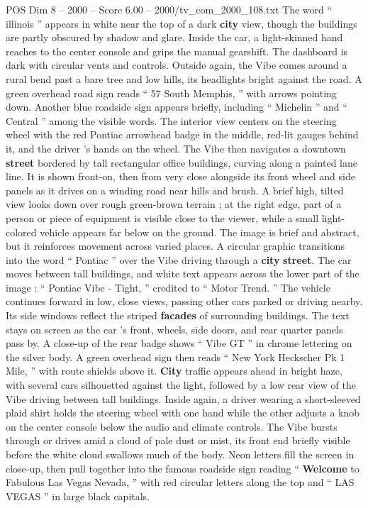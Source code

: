 \begin{textsample}{POS Dim 8 – 2000 – Score 6.00 – 2000/tv\_com\_2000\_108.txt}
The word “ illinois ” appears in white near the top of a dark \textbf{city} view, though the buildings are partly obscured by shadow and glare.
Inside the car, a light-skinned hand reaches to the center console and grips the manual gearshift.
The dashboard is dark with circular vents and controls.
Outside again, the Vibe comes around a rural bend past a bare tree and low hills, its headlights bright against the road.
A green overhead road sign reads “ 57 South Memphis, ” with arrows pointing down.
Another blue roadside sign appears briefly, including “ Michelin ” and “ Central ” among the visible words.
The interior view centers on the steering wheel with the red Pontiac arrowhead badge in the middle, red-lit gauges behind it, and the driver ’s hands on the wheel.
The Vibe then navigates a downtown \textbf{street} bordered by tall rectangular office buildings, curving along a painted lane line.
It is shown front-on, then from very close alongside its front wheel and side panels as it drives on a winding road near hills and brush.
A brief high, tilted view looks down over rough green-brown terrain ; at the right edge, part of a person or piece of equipment is visible close to the viewer, while a small light-colored vehicle appears far below on the ground.
The image is brief and abstract, but it reinforces movement across varied places.
A circular graphic transitions into the word “ Pontiac ” over the Vibe driving through a \textbf{city} \textbf{street}.
The car moves between tall buildings, and white text appears across the lower part of the image : “ Pontiac Vibe - Tight, ” credited to “ Motor Trend. ” The vehicle continues forward in low, close views, passing other cars parked or driving nearby.
Its side windows reflect the striped \textbf{facades} of surrounding buildings.
The text stays on screen as the car ’s front, wheels, side doors, and rear quarter panels pass by.
A close-up of the rear badge shows “ Vibe GT ” in chrome lettering on the silver body.
A green overhead sign then reads “ New York Heckscher Pk 1 Mile, ” with route shields above it. \textbf{City} traffic appears ahead in bright haze, with several cars silhouetted against the light, followed by a low rear view of the Vibe driving between tall buildings.
Inside again, a driver wearing a short-sleeved plaid shirt holds the steering wheel with one hand while the other adjusts a knob on the center console below the audio and climate controls.
The Vibe bursts through or drives amid a cloud of pale dust or mist, its front end briefly visible before the white cloud swallows much of the body.
Neon letters fill the screen in close-up, then pull together into the famous roadside sign reading “ \textbf{Welcome} to Fabulous Las Vegas Nevada, ” with red circular letters along the top and “ LAS VEGAS ” in large black capitals.

\end{textsample}
